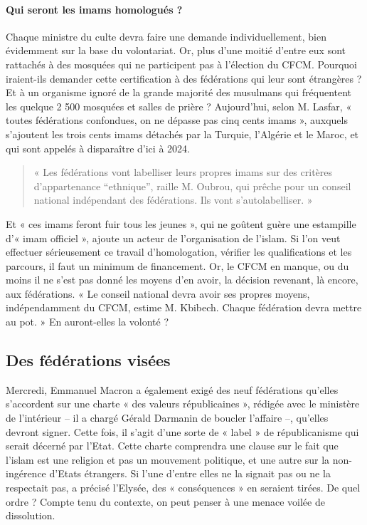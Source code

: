 \paragraph{Qui seront les imams homologués ?} Chaque ministre du culte devra faire une demande individuellement, bien évidemment sur la base du volontariat. Or, plus d’une moitié d’entre eux sont rattachés à des mosquées qui ne participent pas à l’élection du CFCM. Pourquoi iraient-ils demander cette certification à des fédérations qui leur sont étrangères ? Et à un organisme ignoré de la grande majorité des musulmans qui fréquentent les quelque 2 500 mosquées et salles de prière ?
Aujourd’hui, selon M. Lasfar, « toutes fédérations confondues, on ne dépasse pas cinq cents imams », auxquels s’ajoutent les trois cents imams détachés par la Turquie, l’Algérie et le Maroc, et qui sont appelés à disparaître d’ici à 2024. 
\begin{quote}
    « Les fédérations vont labelliser leurs propres imams sur des critères d’appartenance “ethnique”, raille M. Oubrou, qui prêche pour un conseil national indépendant des fédérations. Ils vont s’autolabelliser. » 
\end{quote}
Et « ces imams feront fuir tous les jeunes », qui ne goûtent guère une estampille d’« imam officiel », ajoute un acteur de l’organisation de l’islam.
Si l’on veut effectuer sérieusement ce travail d’homologation, vérifier les qualifications et les parcours, il faut un minimum de financement. Or, le CFCM en manque, ou du moins il ne s’est pas donné les moyens d’en avoir, la décision revenant, là encore, aux fédérations. « Le conseil national devra avoir ses propres moyens, indépendamment du CFCM, estime M. Kbibech. Chaque fédération devra mettre au pot. » En auront-elles la volonté ?
\subsection*{Des fédérations visées}
Mercredi, Emmanuel Macron a également exigé des neuf fédérations qu’elles s’accordent sur une charte « des valeurs républicaines », rédigée avec le ministère de l’intérieur – il a chargé Gérald Darmanin de boucler l’affaire –, qu’elles devront signer. Cette fois, il s’agit d’une sorte de « label » de républicanisme qui serait décerné par l’Etat. Cette charte comprendra une clause sur le fait que l’islam est une religion et pas un mouvement politique, et une autre sur la non-ingérence d’Etats étrangers. Si l’une d’entre elles ne la signait pas ou ne la respectait pas, a précisé l’Elysée, des « conséquences » en seraient tirées. De quel ordre ? Compte tenu du contexte, on peut penser à une menace voilée de dissolution.

